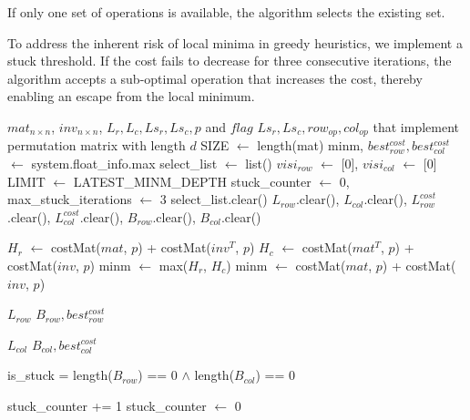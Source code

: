 If only one set of operations is available, the algorithm selects the existing set. 

To address the inherent risk of local minima in greedy heuristics, we implement a stuck threshold. If the cost fails to decrease for three consecutive iterations, the algorithm accepts a sub-optimal operation that increases the cost, thereby enabling an escape from the local minimum.

\begin{algorithm}
\caption{Row\_or\_Col Greedy}
\footnotesize
\begin{algorithmic}[1]
\Require $mat_{n \times n}$, $inv_{n \times n}$, $L_{r}, L_{c}, Ls_{r}, Ls_{c}, p$ and $flag$
\Ensure $Ls_{r}, Ls_{c}, row_{op}, col_{op}$ that implement permutation matrix with length $d$
\State SIZE $\leftarrow$ length(mat)
\State minm, $best_{row}^{cost}, best_{col}^{cost}$ $\leftarrow$ system.float\_info.max
\State select\_list $\leftarrow$ list()
\State $visi_{row}$ $\leftarrow$ [0], $visi_{col}$ $\leftarrow$ [0]
\State LIMIT $\leftarrow$ LATEST\_MINM\_DEPTH
\State stuck\_counter $\leftarrow$ 0, max\_stuck\_iterations $\leftarrow$ 3
	\State select\_list.clear()
	\State $L_{row}$.clear(), $L_{col}$.clear(), $L_{row}^{cost}$.clear(), $L_{col}^{cost}$.clear(), $B_{row}$.clear(), $B_{col}$.clear()
	
		\State $H_r$ $\leftarrow$ costMat($mat$, $p$) + costMat($inv^{T}$, $p$)
		\State $H_c$ $\leftarrow$ costMat($mat^{T}$, $p$) + costMat($inv$, $p$)
		\State minm $\leftarrow$ max($H_r$, $H_c$)
	\Else
		\State minm $\leftarrow$ costMat($mat$, $p$) + costMat($inv$, $p$)
    \EndIf
    
    	\State \Return $L_{row}$
	\EndFunction
    	\State \Return $B_{row}, best_{row}^{cost}$
	\EndFunction
	
    	\State \Return $L_{col}$
	\EndFunction
	\State \Return $B_{col}, best_{col}^{cost}$
	\EndFunction
	
	\State is\_stuck = length($B_{row}$) == 0 $\land$ length($B_{col}$) == 0
	
		\State stuck\_counter += 1
	\Else
		\State stuck\_counter $\leftarrow$ 0
    \EndIf
    

\end{algorithmic}
\end{algorithm}
